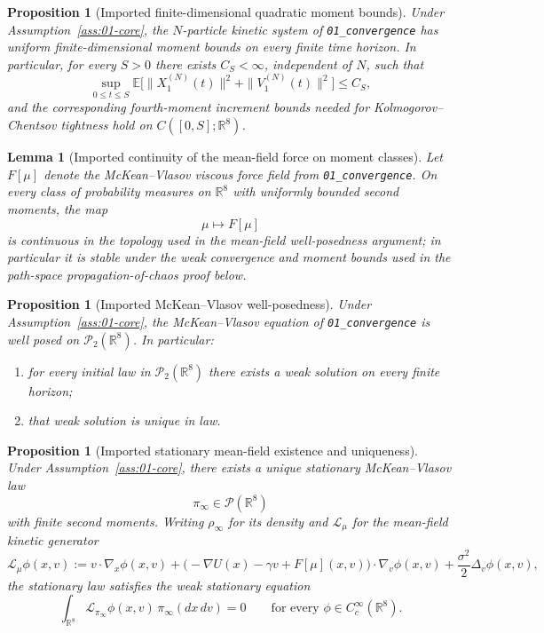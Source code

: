 \documentclass[11pt]{article}
\newtheorem{proposition}[theorem]{Proposition}
\newtheorem{lemma}[theorem]{Lemma}
\theoremstyle{definition}
\theoremstyle{remark}
\newcommand{\R}{\mathbb R}
\newcommand{\E}{\mathbb E}
\newcommand{\mcP}{\mathcal P}
\begin{document}
\begin{proposition}[Imported finite-dimensional quadratic moment bounds]
\label{prop:moments}
Under Assumption~\ref{ass:01-core}, the \(N\)-particle kinetic system of
\texttt{01\_convergence} has uniform finite-dimensional moment bounds on every
finite time horizon. In particular, for every \(S>0\) there exists
\(C_S<\infty\), independent of \(N\), such that
\[
\sup_{0\le t\le S}\E\bigl[\|X_1^{(N)}(t)\|^2+\|V_1^{(N)}(t)\|^2\bigr]
\le C_S,
\]
and the corresponding fourth-moment increment bounds needed for
Kolmogorov--Chentsov tightness hold on \(C([0,S];\R^8)\).
\end{proposition}

\begin{lemma}[Imported continuity of the mean-field force on moment classes]
\label{lem:mf-lipschitz}
Let \(F[\mu]\) denote the McKean--Vlasov viscous force field from
\texttt{01\_convergence}. On every class of probability measures on \(\R^8\)
with uniformly bounded second moments, the map
\[
\mu\longmapsto F[\mu]
\]
is continuous in the topology used in the mean-field well-posedness argument;
in particular it is stable under the weak convergence and moment bounds used in
the path-space propagation-of-chaos proof below.
\end{lemma}

\begin{proposition}[Imported McKean--Vlasov well-posedness]
\label{prop:wp}
Under Assumption~\ref{ass:01-core}, the McKean--Vlasov equation of
\texttt{01\_convergence} is well posed on \(\mcP_2(\R^8)\). In particular:
\begin{enumerate}[leftmargin=1.5em,label=\textnormal{(\roman*)}]
\item for every initial law in \(\mcP_2(\R^8)\) there exists a weak solution on
every finite horizon;
\item that weak solution is unique in law.
\end{enumerate}
\end{proposition}

\begin{proposition}[Imported stationary mean-field existence and uniqueness]
\label{prop:mf-unique}
Under Assumption~\ref{ass:01-core}, there exists a unique stationary
McKean--Vlasov law
\[
\pi_\infty\in\mcP(\R^8)
\]
with finite second moments. Writing \(\rho_\infty\) for its density and
\(\mathcal L_\mu\) for the mean-field kinetic generator
\[
\mathcal L_\mu \phi(x,v)
:=
v\cdot\nabla_x\phi(x,v)
+\bigl(-\nabla U(x)-\gamma v+F[\mu](x,v)\bigr)\cdot\nabla_v\phi(x,v)
+\frac{\sigma^2}{2}\Delta_v\phi(x,v),
\]
the stationary law satisfies the weak stationary equation
\begin{equation}
\label{eq:mf-stationary-weak}
\int_{\R^8}\mathcal L_{\pi_\infty}\phi(x,v)\,\pi_\infty(dx\,dv)=0
\qquad
\text{for every }\phi\in C_c^\infty(\R^8).
\end{equation}
\end{proposition}
\end{document}
